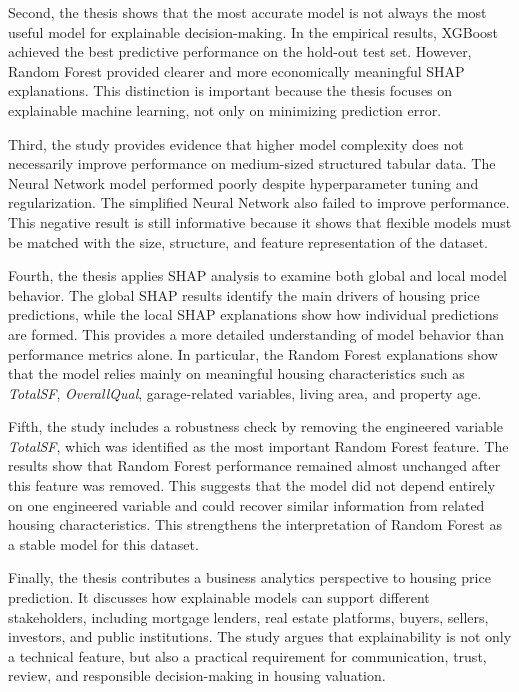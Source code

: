 \documentclass[12pt,a4paper,oneside,openany]{book}
\begin{document}
Second, the thesis shows that the most accurate model is not always the most useful model for explainable decision-making. In the empirical results, XGBoost achieved the best predictive performance on the hold-out test set. However, Random Forest provided clearer and more economically meaningful SHAP explanations. This distinction is important because the thesis focuses on explainable machine learning, not only on minimizing prediction error.

Third, the study provides evidence that higher model complexity does not necessarily improve performance on medium-sized structured tabular data. The Neural Network model performed poorly despite hyperparameter tuning and regularization. The simplified Neural Network also failed to improve performance. This negative result is still informative because it shows that flexible models must be matched with the size, structure, and feature representation of the dataset.

Fourth, the thesis applies SHAP analysis to examine both global and local model behavior. The global SHAP results identify the main drivers of housing price predictions, while the local SHAP explanations show how individual predictions are formed. This provides a more detailed understanding of model behavior than performance metrics alone. In particular, the Random Forest explanations show that the model relies mainly on meaningful housing characteristics such as \textit{TotalSF}, \textit{OverallQual}, garage-related variables, living area, and property age.

Fifth, the study includes a robustness check by removing the engineered variable \textit{TotalSF}, which was identified as the most important Random Forest feature. The results show that Random Forest performance remained almost unchanged after this feature was removed. This suggests that the model did not depend entirely on one engineered variable and could recover similar information from related housing characteristics. This strengthens the interpretation of Random Forest as a stable model for this dataset.

Finally, the thesis contributes a business analytics perspective to housing price prediction. It discusses how explainable models can support different stakeholders, including mortgage lenders, real estate platforms, buyers, sellers, investors, and public institutions. The study argues that explainability is not only a technical feature, but also a practical requirement for communication, trust, review, and responsible decision-making in housing valuation.
\end{document}
